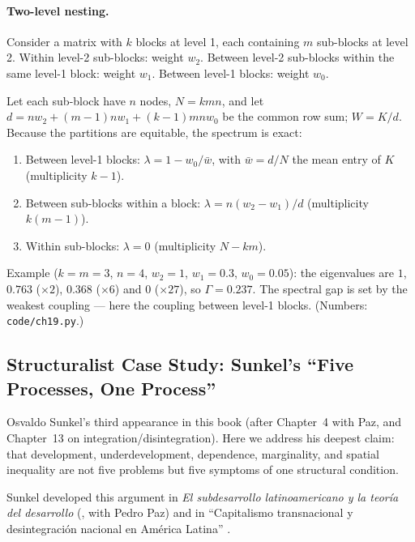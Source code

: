 \documentclass[../structural_economics_book.tex]{subfiles}
\begin{document}
\paragraph{Two-level nesting.} Consider a matrix with $k$ blocks at level 1, each containing $m$ sub-blocks at level 2. Within level-2 sub-blocks: weight $w_2$. Between level-2 sub-blocks within the same level-1 block: weight $w_1$. Between level-1 blocks: weight $w_0$.

Let each sub-block have $n$ nodes, $N = kmn$, and let $d = n w_2 + (m-1)n w_1 + (k-1)mn w_0$ be the common row sum; $W = K/d$. Because the partitions are equitable, the spectrum is exact:
\begin{enumerate}
\item Between level-1 blocks: $\lambda = 1 - w_0/\bar w$, with $\bar w = d/N$ the mean entry of $K$ (multiplicity $k-1$).
\item Between sub-blocks within a block: $\lambda = n(w_2 - w_1)/d$ (multiplicity $k(m-1)$).
\item Within sub-blocks: $\lambda = 0$ (multiplicity $N - km$).
\end{enumerate}
Example ($k = m = 3$, $n = 4$, $w_2 = 1$, $w_1 = 0.3$, $w_0 = 0.05$): the eigenvalues are $1$, $0.763$ ($\times 2$), $0.368$ ($\times 6$) and $0$ ($\times 27$), so $\Gamma = 0.237$. The spectral gap is set by the weakest coupling --- here the coupling between level-1 blocks. (Numbers: \texttt{code/ch19.py}.)


\subsection*{Structuralist Case Study: Sunkel's ``Five Processes, One Process''}

Osvaldo Sunkel's third appearance in this book (after Chapter~4 with Paz, and Chapter~13 on integration/disintegration). Here we address his deepest claim: that development, underdevelopment, dependence, marginality, and spatial inequality are not five problems but five symptoms of one structural condition.

Sunkel developed this argument in \textit{El subdesarrollo latinoamericano y la teor\'{i}a del desarrollo} (\citeyear{sunkel1970subdesarrollo}, with Pedro Paz) and in ``Capitalismo transnacional y desintegraci\'{o}n nacional en Am\'{e}rica Latina'' \citeyearpar{sunkel1971capitalismo}. %
\end{document}
